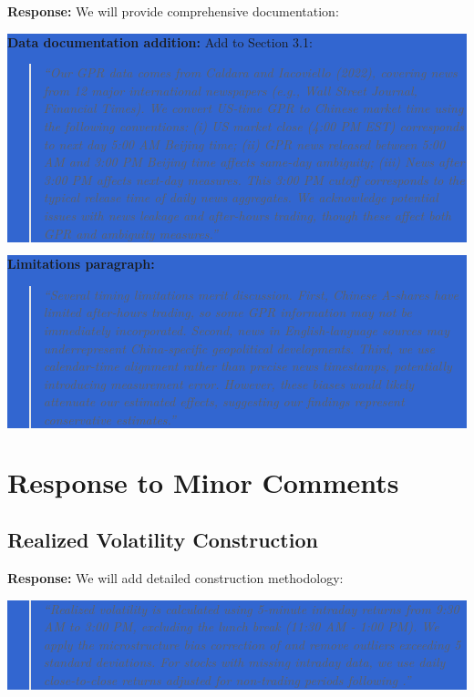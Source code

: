 \documentclass[12pt]{article}
\begin{document}
\textbf{Response:} We will provide comprehensive documentation:

\colorbox{highlight}{\parbox{\dimexpr\linewidth-2\fboxsep}{%
\textbf{Data documentation addition:} Add to Section 3.1:

\begin{quote}
\textit{``Our GPR data comes from Caldara and Iacoviello (2022), covering news from 12 major international newspapers (e.g., Wall Street Journal, Financial Times). We convert US-time GPR to Chinese market time using the following conventions: (i) US market close (4:00 PM EST) corresponds to next day 5:00 AM Beijing time; (ii) GPR news released between 5:00 AM and 3:00 PM Beijing time affects same-day ambiguity; (iii) News after 3:00 PM affects next-day measures. This 3:00 PM cutoff corresponds to the typical release time of daily news aggregates. We acknowledge potential issues with news leakage and after-hours trading, though these affect both GPR and ambiguity measures.''}
\end{quote}
}}

\colorbox{highlight}{\parbox{\dimexpr\linewidth-2\fboxsep}{%
\textbf{Limitations paragraph:}
\begin{quote}
\textit{``Several timing limitations merit discussion. First, Chinese A-shares have limited after-hours trading, so some GPR information may not be immediately incorporated. Second, news in English-language sources may underrepresent China-specific geopolitical developments. Third, we use calendar-time alignment rather than precise news timestamps, potentially introducing measurement error. However, these biases would likely attenuate our estimated effects, suggesting our findings represent conservative estimates.''}
\end{quote}
}}

\section*{Response to Minor Comments}

\subsection*{Realized Volatility Construction}
\textbf{Response:} We will add detailed construction methodology:

\colorbox{highlight}{\parbox{\dimexpr\linewidth-2\fboxsep}{%
\begin{quote}
\textit{``Realized volatility is calculated using 5-minute intraday returns from 9:30 AM to 3:00 PM, excluding the lunch break (11:30 AM - 1:00 PM). We apply the microstructure bias correction of \citet{Hansen2012} and remove outliers exceeding 5 standard deviations. For stocks with missing intraday data, we use daily close-to-close returns adjusted for non-trading periods following \citet{French1980}.''}
\end{quote}
}}
\end{document}
